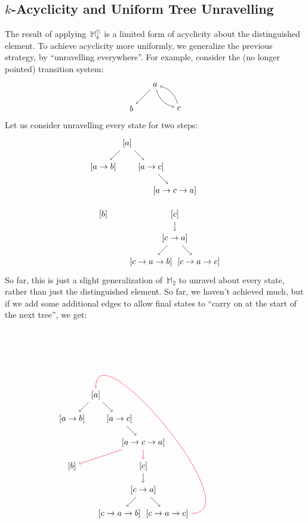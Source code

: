 \documentclass{article}
\theoremstyle{plain}
\theoremstyle{definition}
\theoremstyle{remark}
\numberwithin{theorem}{section}
\newcommand{\M}{\mathbb{M}}
\newcommand{\Mp}{\mathbb{M}^{\circlearrowright}}
\newcommand{\Mpk}{\Mp_{k}}
\begin{document}
\subsection{$k$-Acyclicity and Uniform Tree Unravelling}
The result of applying~$\Mpk$ is a limited form of acyclicity about the distinguished element. To achieve acyclicity more uniformly, we generalize the previous strategy, by ``unravelling everywhere''. For example, consider the (no longer pointed) transition system:
\begin{equation}
    \begin{tikzpicture}
    \path 
    node (a) {$a$} +(-1,-1) 
    node (b) {$b$} +(1,-1) 
    node (c) {$c$};
    \path 
    (a) edge[->] (b) 
    (a) edge[->, bend right] (c)
    (c) edge[->, bend right] (a);
    \end{tikzpicture}
\end{equation}
Let us consider unravelling every state for two steps:
\begin{equation*}
    \begin{tikzpicture}
    \path 
    node (a) {$[a]$} +(-1,-1) 
    node (ab) {$[a \rightarrow b]$} ++(1,-1)
    node (ac) {$[a \rightarrow c]$} ++(1,-1)
    node (aca) {$[a \rightarrow c \rightarrow a]$} ++(0,-1)
    node (c') {$[c]$} ++(0,-1)
    node (c'a) {$[c \rightarrow a]$} +(-1,-1)
    node (c'ab) {$[c \rightarrow a \rightarrow b]$} +(1,-1)
    node (c'ac) {$[c \rightarrow a \rightarrow c]$} (b) ++(0,-2)
    node (b') {$[b]$};
    
    \path 
    (a) edge[->] (ab)
    (a) edge[->] (ac) 
    (ac) edge[->] (aca)
    (c') edge[->] (c'a)
    (c'a) edge[->] (c'ab)
    (c'a) edge[->] (c'ac);
    \end{tikzpicture}
\end{equation*}
So far, this is just a slight generalization of~$\M_{2}$ to unravel about every state, rather than just the distinguished element. So far, we haven't achieved much, but if we add some additional edges to allow final states to ``carry on at the start of the next tree'', we get:
\begin{equation*}
    \begin{tikzpicture}
    \path 
    node (a) {$[a]$} +(-1,-1) 
    node (ab) {$[a \rightarrow b]$} ++(1,-1)
    node (ac) {$[a \rightarrow c]$} ++(1,-1)
    node (aca) {$[a \rightarrow c \rightarrow a]$} ++(0,-1)
    node (c') {$[c]$} ++(0,-1)
    node (c'a) {$[c \rightarrow a]$} +(-1,-1)
    node (c'ab) {$[c \rightarrow a \rightarrow b]$} +(1,-1)
    node (c'ac) {$[c \rightarrow a \rightarrow c]$} (b) ++(0,-2)
    node (b') {$[b]$};
    
    \path 
    (a) edge[->] (ab)
    (a) edge[->] (ac) 
    (ac) edge[->] (aca)
    (c') edge[->] (c'a)
    (c'a) edge[->] (c'ab)
    (c'a) edge[->] (c'ac);
    
    \path[->,red]
    (aca) edge (b')
    (aca) edge (c')
    (c'ac.east) edge[out=0, in=90] (a.north);
    \end{tikzpicture}
\end{equation*}
\end{document}
